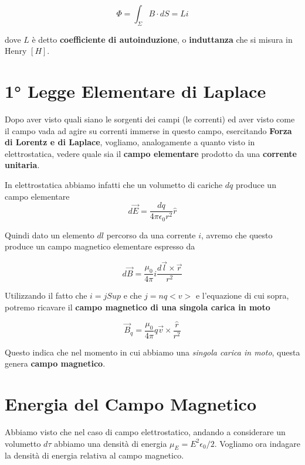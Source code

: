 \begin{large}
	\begin{equation}
		\Phi = \int_{\Sigma} B\cdot dS = Li
	\end{equation}
\end{large}

dove $L$ è detto \textbf{coefficiente di autoinduzione}, o \textbf{induttanza} che si misura in Henry $\left[H\right]$.

\section{1° Legge Elementare di Laplace}
Dopo aver visto quali siano le sorgenti dei campi (le correnti) ed aver visto come il campo vada ad agire su correnti immerse in questo campo, esercitando \textbf{Forza di Lorentz e di Laplace}, vogliamo, analogamente a quanto visto in elettrostatica, vedere quale sia il \textbf{campo elementare} prodotto da una \textbf{corrente unitaria}. 

In elettrostatica abbiamo infatti che un volumetto di cariche $dq$ produce un campo elementare
$$
d\vec{E} = \frac{dq}{4\pi\epsilon_0r^2}\hat{r}
$$

Quindi dato un elemento $dl$ percorso da una corrente $i$, avremo che questo produce un campo magnetico elementare espresso da 

\begin{large}
\begin{equation} \label{eq_campoElementare}
		d\vec{B} = \frac{\mu_0}{4\pi} i \frac{d\vec{l} \times \vec{r}}{r^2}
\end{equation}
\end{large}

Utilizzando il fatto che $i = j Sup$ e che $j = nq<v>$ e l'equazione di cui sopra, potremo ricavare il \textbf{campo magnetico di una singola carica in moto}

\begin{large}
	\begin{equation}
		\vec{B}_q = \frac{\mu_0}{4\pi} q\vec{v} \times \frac{\hat{r}}{r^2}
	\end{equation}
\end{large}

Questo indica che nel momento in cui abbiamo una \textit{singola carica in moto}, questa genera \textbf{campo magnetico}. 

\section{Energia del Campo Magnetico}
Abbiamo visto che nel caso di campo elettrostatico, andando a considerare un volumetto $d\tau$ abbiamo una densità di energia $\mu_E = E^2 \epsilon_0 / 2$. Vogliamo ora indagare la densità di energia relativa al campo magnetico. 

